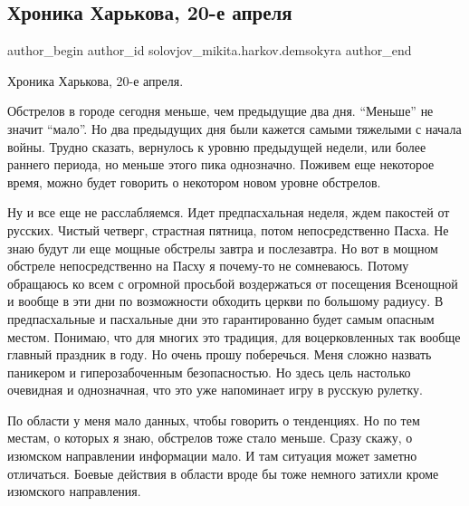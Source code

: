  
 
 
 
 
 
\subsection{Хроника Харькова, 20-е апреля}
\label{sec:20_04_2022.fb.solovjov_mikita.harkov.demsokyra.1.hronika}
 
\ifcmt
 author_begin
   author_id solovjov_mikita.harkov.demsokyra
 author_end
\fi

Хроника Харькова, 20-е апреля. 

Обстрелов в городе сегодня меньше, чем предыдущие два дня. \enquote{Меньше} не значит
\enquote{мало}. Но два предыдущих дня были кажется самыми тяжелыми с начала войны.
Трудно сказать, вернулось к уровню предыдущей недели, или более раннего
периода, но меньше этого пика однозначно. Поживем еще некоторое время, можно
будет говорить о некотором новом уровне обстрелов. 

Ну и все еще не расслабляемся. Идет предпасхальная неделя, ждем пакостей от
русских. Чистый четверг, страстная пятница, потом непосредственно Пасха. Не
знаю будут ли еще мощные обстрелы завтра и послезавтра. Но вот в мощном
обстреле непосредственно на Пасху я почему-то не сомневаюсь. Потому обращаюсь
ко всем с огромной просьбой воздержаться от посещения Всенощной и вообще в эти
дни по возможности обходить церкви по большому радиусу. В предпасхальные и
пасхальные дни это гарантированно будет самым опасным местом. Понимаю, что для
многих это традиция, для воцерковленных так вообще главный праздник в году. Но
очень прошу поберечься. Меня сложно назвать паникером и гиперозабоченным
безопасностью. Но здесь цель настолько очевидная и однозначная, что это уже
напоминает игру в русскую рулетку. 

По области у меня мало данных, чтобы говорить о тенденциях. Но по тем местам, о
которых я знаю, обстрелов тоже стало меньше. Сразу скажу, о изюмском
направлении информации мало. И там ситуация может заметно отличаться. Боевые
действия в области вроде бы тоже немного затихли кроме изюмского направления. 

